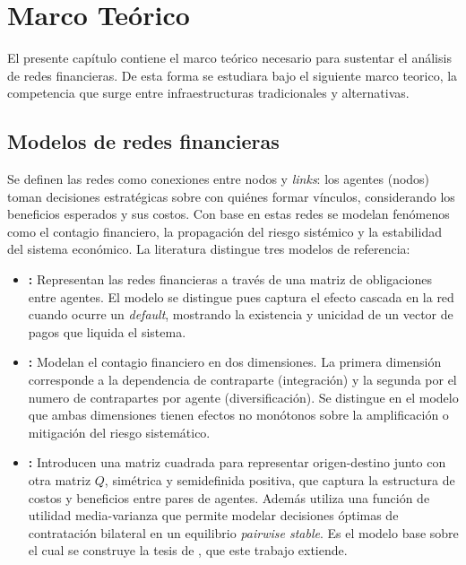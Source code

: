 
\chapter{Marco Teórico}
\label{c2}


El presente capítulo contiene el marco teórico necesario para sustentar el análisis de redes financieras. De esta forma se estudiara bajo el siguiente marco teorico, la competencia que surge entre infraestructuras tradicionales y alternativas.

\section{Modelos de redes financieras}\label{c22}

Se definen las redes como conexiones entre nodos y \textit{links}: los agentes
(nodos) toman decisiones estratégicas sobre con quiénes formar vínculos,
considerando los beneficios esperados y sus costos. Con base en estas redes se modelan fenómenos como el contagio financiero, la propagación del riesgo sistémico y la estabilidad del sistema económico. La literatura distingue tres
modelos de referencia:

\begin{itemize}
    \item \textbf{:} Representan las redes
    financieras a través de una matriz de obligaciones entre agentes. El modelo se distingue pues captura el efecto
    cascada en la red cuando ocurre un \textit{default}, mostrando la existencia
    y unicidad de un vector de pagos que liquida el sistema.

    \item \textbf{:} Modelan el contagio financiero en dos dimensiones. La primera dimensión corresponde a la dependencia de contraparte (integración) y la segunda por el numero de contrapartes por agente (diversificación). Se distingue en el modelo que ambas dimensiones tienen efectos no monótonos sobre la amplificación o mitigación del riesgo sistemático.

    \item \textbf{:} Introducen una matriz cuadrada para representar origen-destino junto con otra matriz $Q$, simétrica y semidefinida positiva, que captura la estructura de costos y
    beneficios entre pares de agentes. Además utiliza una función de utilidad media-varianza que permite modelar decisiones óptimas de contratación bilateral en un equilibrio \textit{pairwise stable}. Es el modelo base sobre
    el cual se construye la tesis de , que este
    trabajo extiende.
\end{itemize}

